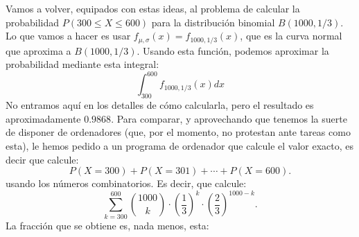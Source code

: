 \begin{ejemplo}
\label{cap05:ejem:DistribucionBinomialProbabilidadIntervalo02}
Vamos a volver, equipados con estas ideas, al  problema de calcular la probabilidad $P(300\leq X\leq 600)$\label{cap05:lugar:DiscusionAproximarBinomialNormal} para la distribución binomial $B(1000,1/3)$. Lo que vamos a hacer es usar
$f_{\mu,\sigma}(x)=f_{1000,1/3}(x)$, que es la curva normal que aproxima a $B(1000,1/3)$. Usando esta función, podemos aproximar la probabilidad mediante esta integral:
\[\int_{300}^{600}f_{1000,1/3}(x)dx\]
No entramos aquí en los detalles de cómo calcularla, pero el resultado es aproximadamente $0.9868$. Para comparar, y aprovechando que tenemos la suerte de disponer de ordenadores (que, por el momento, no protestan ante tareas como esta), le hemos pedido a un programa de ordenador que calcule el valor exacto, es decir que calcule:
\[P(X=300)+P(X=301)+\cdots+P(X=600).\]
usando los números combinatorios. Es decir, que calcule:
\[\sum_{k=300}^{600}\binom{1000}{k}\cdot\left(\dfrac{1}{3}\right)^k\cdot\left(\dfrac{2}{3}\right)^{1000-k}.\]
La fracción que se obtiene es, nada menos, esta:\\

\end{ejemplo}
